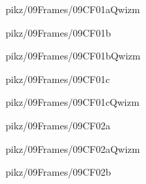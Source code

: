 \documentclass[9pt,xcolor={svgnames, x11names}]{beamer}
\begin{document}
\begin{frame}{pikz/09Frames/09CF01aQwizm}
  
\end{frame}


\begin{frame}{pikz/09Frames/09CF01b}
  
\end{frame}


\begin{frame}{pikz/09Frames/09CF01bQwizm}
  
\end{frame}


\begin{frame}{pikz/09Frames/09CF01c}
  
\end{frame}


\begin{frame}{pikz/09Frames/09CF01cQwizm}
  
\end{frame}


\begin{frame}{pikz/09Frames/09CF02a}
  
\end{frame}


\begin{frame}{pikz/09Frames/09CF02aQwizm}
  
\end{frame}


\begin{frame}{pikz/09Frames/09CF02b}
  
\end{frame}
\end{document}
